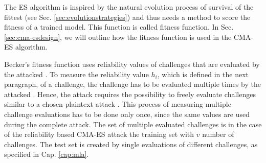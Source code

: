 The \ac{ES} algorithm is inspired by the natural evolution process of survival of the fittest (see Sec. \ref{sec:evolutionstrategies}) and thus needs a method to score the fitness of a trained model.
This function is called fitness function.
In Sec. \ref{sec:cma-esdesign}, we will outline how the fitness function is used in the \ac{CMA-ES} algorithm.


Becker's fitness function uses reliability values of challenges that are evaluated by the attacked \puf.
To measure the reliability value $h_i$, which is defined in the next paragraph, of a challenge, the challenge has to be evaluated multiple times by the attacked \puf.
Hence, the attack requires the possibility to freely evaluate challenges similar to a chosen-plaintext attack \cite{Wikipedia2016Chosen-plaintextAttack}.
This process of measuring multiple challenge evaluations has to be done only once, since the same values are used during the complete attack. %
The set of multiple evaluated challenges is in the case of the reliability based \ac{CMA-ES} attack the training set with $v$ number of challenges.
The test set is created by single evaluations of different challenges, as specified in Cap. \ref{cap:mla}.




